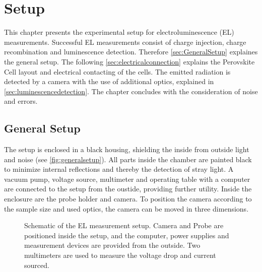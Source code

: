 \chapter{Setup}
This chapter presents the experimental setup for electroluminescence (EL) measurements. Successful EL measurements consist of charge injection, charge recombination and luminescence detection. Therefore \autoref{sec:GeneralSetup} explaines the general setup. The following \autoref{sec:electricalconnection} explains the Perovskite Cell layout and electrical contacting of the cells. The emitted radiation is detected by a camera with the use of additional optics,  explained in \autoref{sec:luminescencedetection}. The chapter concludes with the consideration of noise and errors.

\section{General Setup}\label{sec:GeneralSetup}
The setup is enclosed in a black housing, shielding the inside from outside light and noise (see \autoref{fig:generalsetup}). All parts inside the chamber are painted black to minimize internal reflections and thereby the detection of stray light. A vacuum pump, voltage source, multimeter and operating table with a computer are connected to the setup from the oustide, providing further utility. Inside the enclosure are the probe holder and camera. To position the camera according to the sample size and used optics, the camera can be moved in three dimensions.
\begin{figure}[h]
	\centering
	
	\caption{Schematic of the EL measurement setup. Camera and Probe are positioned inside the setup, and the computer, power supplies and measurement devices are provided from the outside. Two multimeters are used to measure the voltage drop and current sourced.}
	\label{fig:generalsetup}
\end{figure}
\FloatBarrier
